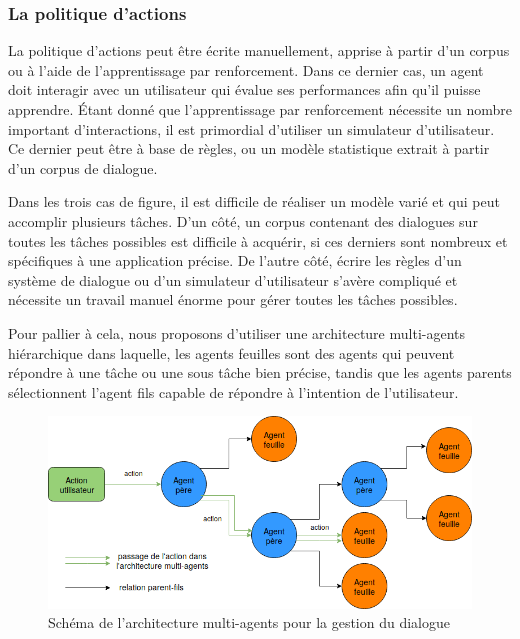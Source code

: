 \subsubsection{La politique d'actions}
La politique d'actions peut être écrite manuellement, apprise à partir d'un corpus ou à l'aide de l'apprentissage par renforcement. Dans ce dernier cas, un agent doit interagir avec un utilisateur qui évalue ses performances afin qu'il puisse apprendre. Étant donné que l'apprentissage par renforcement nécessite un nombre important d'interactions, il est primordial d'utiliser un simulateur d'utilisateur. Ce dernier peut être à base de règles, ou un modèle statistique extrait à partir d'un corpus de dialogue.
\par Dans les trois cas de figure, il est difficile de réaliser un modèle varié et qui peut accomplir plusieurs tâches. D'un côté, un corpus contenant des dialogues sur toutes les tâches possibles est difficile à acquérir, si ces derniers sont nombreux et spécifiques à une application précise. De l'autre côté, écrire les règles d'un système de dialogue ou d'un simulateur d'utilisateur s'avère compliqué et nécessite un travail manuel énorme pour gérer toutes les tâches possibles.
\par Pour pallier à cela, nous proposons d'utiliser une architecture multi-agents hiérarchique dans laquelle, les agents feuilles sont des agents qui peuvent répondre à une tâche ou une sous tâche bien précise, tandis que les agents parents sélectionnent l'agent fils capable de répondre à l'intention de l'utilisateur.
\begin{figure}[H] 
	
	\centering
	\includegraphics[width=0.8\linewidth]{images/Conception/DM/multiagent.png}
	\caption{Schéma de l'architecture multi-agents pour la gestion du dialogue}
\end{figure}\label{multiagent}
